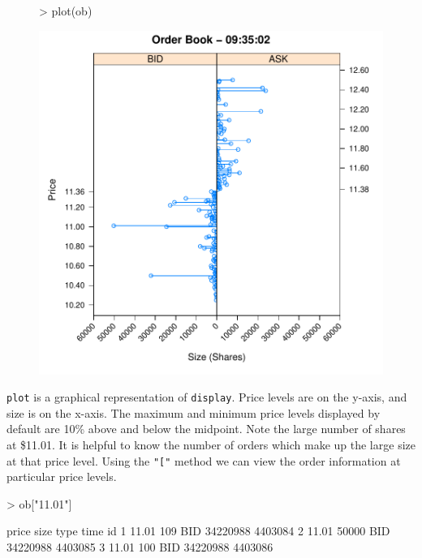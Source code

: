\begin{figure}
\centering
\vspace*{.1in}
\begin{Schunk}
\begin{Sinput}
> plot(ob)
\end{Sinput}
\end{Schunk}
\includegraphics[scale = 0.5]{orderbook-005}
\end{figure}

\texttt{plot} is a graphical representation of \texttt{display}. Price
levels are on the y-axis, and size is on the x-axis. The maximum and
minimum price levels displayed by default are 10\% above and below the
midpoint. Note the large number of shares at \$11.01. It is helpful to
know the number of orders which make up the large size at that price
level. Using the \texttt{"["} method we can view the order information
at particular price levels.

\begin{Schunk}
\begin{Sinput}
> ob["11.01"]
\end{Sinput}
\begin{Soutput}
  price  size type     time      id
1 11.01   109  BID 34220988 4403084
2 11.01 50000  BID 34220988 4403085
3 11.01   100  BID 34220988 4403086
\end{Soutput}
\end{Schunk}

